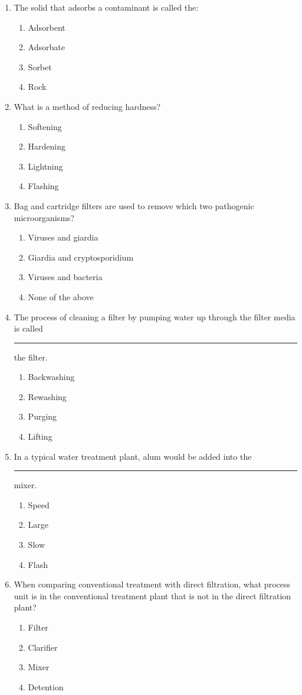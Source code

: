 \documentclass{article}
\begin{document}
\begin{enumerate}
\item The solid that adsorbs a contaminant is called the:
\begin{enumerate}
\item Adsorbent
\item Adsorbate
\item Sorbet
\item Rock
\end{enumerate}

\item What is a method of reducing hardness?
\begin{enumerate}
\item Softening
\item Hardening
\item Lightning
\item Flashing
\end{enumerate}


\item Bag and cartridge filters are used to remove which two pathogenic microorganisms?
\begin{enumerate}
\item Viruses and giardia
\item Giardia and cryptosporidium
\item Viruses and bacteria
\item None of the above
\end{enumerate}

\item The process of cleaning a filter by pumping water up through the filter media is called \rule{2cm}{0.3pt} the filter.
\begin{enumerate}
\item Backwashing
\item Rewashing
\item Purging
\item Lifting
\end{enumerate}

\item In a typical water treatment plant, alum would be added into the \rule{2cm}{0.3pt} mixer.
\begin{enumerate}
\item Speed
\item Large
\item Slow
\item Flash
\end{enumerate}

\item When comparing conventional treatment with direct filtration, what process unit is in the conventional treatment plant that is not in the direct filtration plant?
\begin{enumerate}
\item Filter
\item Clarifier
\item Mixer
\item Detention
\end{enumerate}


\end{enumerate}
\end{document}
